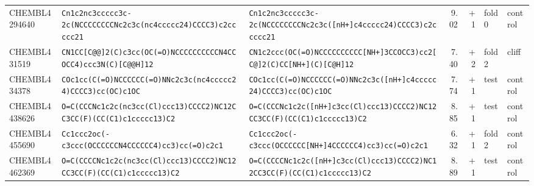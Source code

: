 \begin{longtable}{l p{4.4cm} p{4.4cm} r r l l}
CHEMBL4294640 & \texttt{Cn1c2nc3ccccc3c-2c(\allowbreak{}NCCCCCCCCNc2c3c(\allowbreak{}nc4ccccc24)\allowbreak{}CCCC3)\allowbreak{}c2ccccc21} & \texttt{Cn1c2nc3ccccc3c-2c(\allowbreak{}NCCCCCCCCNc2c3c(\allowbreak{}[nH+]\allowbreak{}c4ccccc24)\allowbreak{}CCCC3)\allowbreak{}c2ccccc21} & 9.02 & +1 & fold 0 & control \\
CHEMBL431519 & \texttt{CN1CC[C@@]\allowbreak{}2(\allowbreak{}C)\allowbreak{}c3cc(\allowbreak{}OC(\allowbreak{}=\allowbreak{}O)\allowbreak{}NCCCCCCCCCCN4CCOCC4)\allowbreak{}ccc3N(\allowbreak{}C)\allowbreak{}[C@@H]\allowbreak{}12} & \texttt{CN1c2ccc(\allowbreak{}OC(\allowbreak{}=\allowbreak{}O)\allowbreak{}NCCCCCCCCCC[NH+]\allowbreak{}3CCOCC3)\allowbreak{}cc2[C@]\allowbreak{}2(\allowbreak{}C)\allowbreak{}CC[NH+]\allowbreak{}(\allowbreak{}C)\allowbreak{}[C@H]\allowbreak{}12} & 7.40 & +2 & fold 2 & cliff \\
CHEMBL434378 & \texttt{COc1cc(\allowbreak{}C(\allowbreak{}=\allowbreak{}O)\allowbreak{}NCCCCCC(\allowbreak{}=\allowbreak{}O)\allowbreak{}NNc2c3c(\allowbreak{}nc4ccccc24)\allowbreak{}CCCC3)\allowbreak{}cc(\allowbreak{}OC)\allowbreak{}c1OC} & \texttt{COc1cc(\allowbreak{}C(\allowbreak{}=\allowbreak{}O)\allowbreak{}NCCCCCC(\allowbreak{}=\allowbreak{}O)\allowbreak{}NNc2c3c(\allowbreak{}[nH+]\allowbreak{}c4ccccc24)\allowbreak{}CCCC3)\allowbreak{}cc(\allowbreak{}OC)\allowbreak{}c1OC} & 7.74 & +1 & test & control \\
CHEMBL4438626 & \texttt{O=\allowbreak{}C(\allowbreak{}CCCNc1c2c(\allowbreak{}nc3cc(\allowbreak{}Cl)\allowbreak{}ccc13)\allowbreak{}CCCC2)\allowbreak{}NC12CC3CC(\allowbreak{}F)\allowbreak{}(\allowbreak{}CC(\allowbreak{}C1)\allowbreak{}c1ccccc13)\allowbreak{}C2} & \texttt{O=\allowbreak{}C(\allowbreak{}CCCNc1c2c(\allowbreak{}[nH+]\allowbreak{}c3cc(\allowbreak{}Cl)\allowbreak{}ccc13)\allowbreak{}CCCC2)\allowbreak{}NC12CC3CC(\allowbreak{}F)\allowbreak{}(\allowbreak{}CC(\allowbreak{}C1)\allowbreak{}c1ccccc13)\allowbreak{}C2} & 8.85 & +1 & test & control \\
CHEMBL4455690 & \texttt{Cc1ccc2oc(\allowbreak{}-c3ccc(\allowbreak{}OCCCCCCN4CCCCCC4)\allowbreak{}cc3)\allowbreak{}cc(\allowbreak{}=\allowbreak{}O)\allowbreak{}c2c1} & \texttt{Cc1ccc2oc(\allowbreak{}-c3ccc(\allowbreak{}OCCCCCC[NH+]\allowbreak{}4CCCCCC4)\allowbreak{}cc3)\allowbreak{}cc(\allowbreak{}=\allowbreak{}O)\allowbreak{}c2c1} & 6.32 & +1 & fold 2 & control \\
CHEMBL4462369 & \texttt{O=\allowbreak{}C(\allowbreak{}CCCCNc1c2c(\allowbreak{}nc3cc(\allowbreak{}Cl)\allowbreak{}ccc13)\allowbreak{}CCCC2)\allowbreak{}NC12CC3CC(\allowbreak{}F)\allowbreak{}(\allowbreak{}CC(\allowbreak{}C1)\allowbreak{}c1ccccc13)\allowbreak{}C2} & \texttt{O=\allowbreak{}C(\allowbreak{}CCCCNc1c2c(\allowbreak{}[nH+]\allowbreak{}c3cc(\allowbreak{}Cl)\allowbreak{}ccc13)\allowbreak{}CCCC2)\allowbreak{}NC12CC3CC(\allowbreak{}F)\allowbreak{}(\allowbreak{}CC(\allowbreak{}C1)\allowbreak{}c1ccccc13)\allowbreak{}C2} & 8.89 & +1 & test & control \\

\end{longtable}
